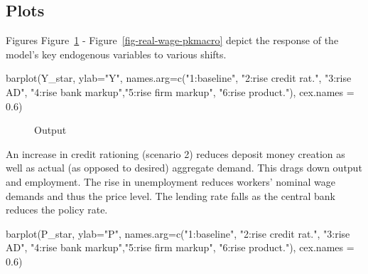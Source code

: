 \documentclass[
  letterpaper,
  DIV=11,
  numbers=noendperiod]{scrreprt}
\newenvironment{Shaded}{\begin{snugshade}}{\end{snugshade}}
\newcommand{\AttributeTok}[1]{\textcolor[rgb]{0.40,0.45,0.13}{#1}}
\newcommand{\FloatTok}[1]{\textcolor[rgb]{0.68,0.00,0.00}{#1}}
\newcommand{\FunctionTok}[1]{\textcolor[rgb]{0.28,0.35,0.67}{#1}}
\newcommand{\NormalTok}[1]{\textcolor[rgb]{0.00,0.23,0.31}{#1}}
\newcommand{\StringTok}[1]{\textcolor[rgb]{0.13,0.47,0.30}{#1}}
\begin{document}
\subsection{Plots}\label{plots-3}

Figures Figure~\ref{fig-output-pkmacro} -
Figure~\ref{fig-real-wage-pkmacro} depict the response of the model's
key endogenous variables to various shifts.

\begin{Shaded}
\begin{Highlighting}[]
\FunctionTok{barplot}\NormalTok{(Y\_star, }\AttributeTok{ylab=}\StringTok{"Y"}\NormalTok{, }\AttributeTok{names.arg=}\FunctionTok{c}\NormalTok{(}\StringTok{"1:baseline"}\NormalTok{, }\StringTok{"2:rise credit rat."}\NormalTok{, }\StringTok{"3:rise AD"}\NormalTok{,}
                                      \StringTok{"4:rise bank markup"}\NormalTok{,}\StringTok{"5:rise firm markup"}\NormalTok{, }\StringTok{"6:rise product."}\NormalTok{), }\AttributeTok{cex.names =} \FloatTok{0.6}\NormalTok{)}
\end{Highlighting}
\end{Shaded}

\begin{figure}[H]


\caption{\label{fig-output-pkmacro}Output}

\end{figure}%

An increase in credit rationing (scenario 2) reduces deposit money
creation as well as actual (as opposed to desired) aggregate demand.
This drags down output and employment. The rise in unemployment reduces
workers' nominal wage demands and thus the price level. The lending rate
falls as the central bank reduces the policy rate.

\begin{Shaded}
\begin{Highlighting}[]
\FunctionTok{barplot}\NormalTok{(P\_star, }\AttributeTok{ylab=}\StringTok{"P"}\NormalTok{, }\AttributeTok{names.arg=}\FunctionTok{c}\NormalTok{(}\StringTok{"1:baseline"}\NormalTok{, }\StringTok{"2:rise credit rat."}\NormalTok{, }\StringTok{"3:rise AD"}\NormalTok{,}
                                      \StringTok{"4:rise bank markup"}\NormalTok{,}\StringTok{"5:rise firm markup"}\NormalTok{, }\StringTok{"6:rise product."}\NormalTok{), }\AttributeTok{cex.names =} \FloatTok{0.6}\NormalTok{)}
\end{Highlighting}
\end{Shaded}
\end{document}
